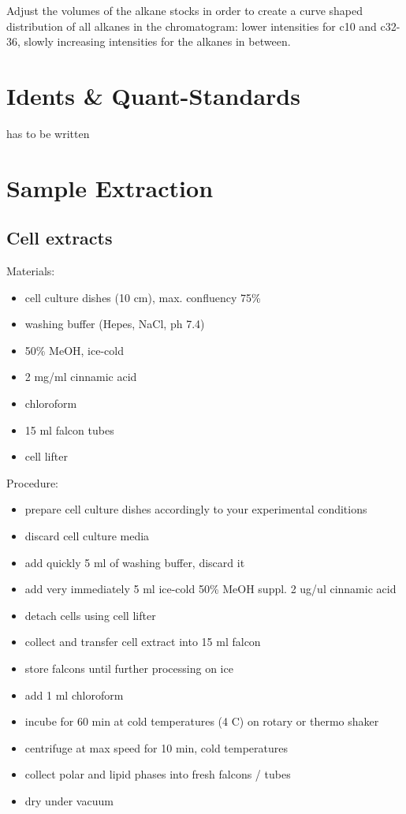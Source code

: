 \documentclass[]{book}
\providecommand{\tightlist}{%
  \setlength{\itemsep}{0pt}\setlength{\parskip}{0pt}}
\begin{document}
Adjust the volumes of the alkane stocks in order to create a curve shaped distribution of all alkanes in the chromatogram: lower intensities for c10 and c32-36, slowly increasing intensities for the alkanes in between.

\hypertarget{standards}{%
\section{Idents \& Quant-Standards}\label{standards}}

has to be written

\hypertarget{SampleExtraction}{%
\section{Sample Extraction}\label{SampleExtraction}}

\hypertarget{cell-extracts}{%
\subsection{Cell extracts}\label{cell-extracts}}

Materials:

\begin{itemize}
\tightlist
\item
  cell culture dishes (10 cm), max. confluency 75\%
\item
  washing buffer (Hepes, NaCl, ph 7.4)
\item
  50\% MeOH, ice-cold
\item
  2 mg/ml cinnamic acid
\item
  chloroform
\item
  15 ml falcon tubes
\item
  cell lifter
\end{itemize}

Procedure:

\begin{itemize}
\tightlist
\item
  prepare cell culture dishes accordingly to your experimental conditions
\item
  discard cell culture media
\item
  add quickly 5 ml of washing buffer, discard it
\item
  add very immediately 5 ml ice-cold 50\% MeOH suppl. 2 ug/ul cinnamic acid
\item
  detach cells using cell lifter
\item
  collect and transfer cell extract into 15 ml falcon
\item
  store falcons until further processing on ice
\item
  add 1 ml chloroform
\item
  incube for 60 min at cold temperatures (4 C) on rotary or thermo shaker
\item
  centrifuge at max speed for 10 min, cold temperatures
\item
  collect polar and lipid phases into fresh falcons / tubes
\item
  dry under vacuum
\end{itemize}
\end{document}
